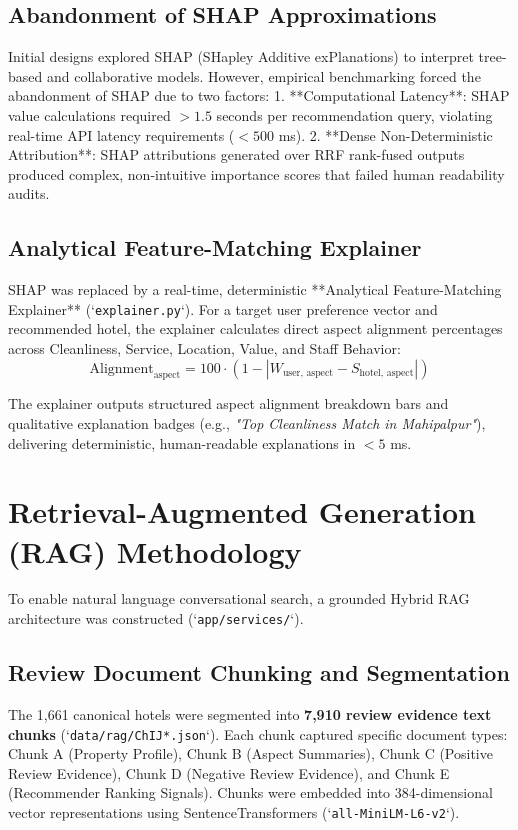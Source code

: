 \subsection{Abandonment of SHAP Approximations}
Initial designs explored SHAP (SHapley Additive exPlanations) to interpret tree-based and collaborative models. However, empirical benchmarking forced the abandonment of SHAP due to two factors:
1. **Computational Latency**: SHAP value calculations required $> 1.5$ seconds per recommendation query, violating real-time API latency requirements ($< 500$ ms).
2. **Dense Non-Deterministic Attribution**: SHAP attributions generated over RRF rank-fused outputs produced complex, non-intuitive importance scores that failed human readability audits.

\subsection{Analytical Feature-Matching Explainer}
SHAP was replaced by a real-time, deterministic **Analytical Feature-Matching Explainer** (`\texttt{explainer.py}`). For a target user preference vector and recommended hotel, the explainer calculates direct aspect alignment percentages across Cleanliness, Service, Location, Value, and Staff Behavior:
\begin{equation}
\text{Alignment}_{\text{aspect}} = 100 \cdot \left(1 - |W_{\text{user, aspect}} - S_{\text{hotel, aspect}}|\right)
\end{equation}

The explainer outputs structured aspect alignment breakdown bars and qualitative explanation badges (e.g., \textit{"Top Cleanliness Match in Mahipalpur"}), delivering deterministic, human-readable explanations in $< 5$ ms.

\section{Retrieval-Augmented Generation (RAG) Methodology}
To enable natural language conversational search, a grounded Hybrid RAG architecture was constructed (`\texttt{app/services/}`).

\subsection{Review Document Chunking and Segmentation}
The 1,661 canonical hotels were segmented into \textbf{7,910 review evidence text chunks} (`\texttt{data/rag/ChIJ*.json}`). Each chunk captured specific document types: Chunk A (Property Profile), Chunk B (Aspect Summaries), Chunk C (Positive Review Evidence), Chunk D (Negative Review Evidence), and Chunk E (Recommender Ranking Signals). Chunks were embedded into 384-dimensional vector representations using SentenceTransformers (`\texttt{all-MiniLM-L6-v2}`).

